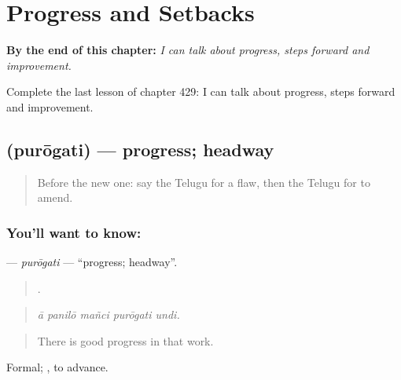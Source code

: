 
\chapter{Progress and Setbacks}
\label{ch:te-progress-and-setbacks}

\begin{chapteropening}
\textbf{By the end of this chapter:} \emph{I can talk about progress, steps forward and improvement.}

Complete the last lesson of chapter 429: I can talk about progress, steps forward and improvement.
\end{chapteropening}

\section[\texorpdfstring{\te{పురోగతి} (purōgati)}{పురోగతి (purōgati)}]{ (purōgati) — progress; headway}

\label{lesson:TE-C429-purogati}



\begin{quote}
Before the new one: say the Telugu for a flaw, then the Telugu for to amend.
\end{quote}

\subsection*{You'll want to know: }
\textbf{} — \emph{purōgati} — \textquotedblleft{}progress; headway\textquotedblright{}.

\begin{quote}
    .
\end{quote}

\begin{quote}
\emph{ā panilō mañci purōgati undi.}
\end{quote}

\begin{quote}
There is good progress in that work.
\end{quote}

Formal; , to advance.

